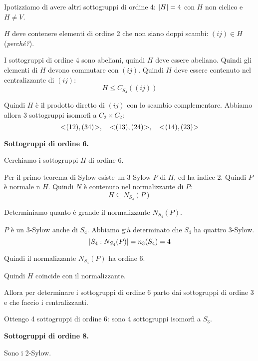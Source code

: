 \begin{soluzione}
    Ipotizziamo di avere altri sottogruppi di ordine 4: $\lvert H \rvert = 4$ con $H$ non ciclico e $H \ne V$.

    $H$ deve contenere elementi di ordine 2 che non siano doppi scambi: $(ij) \in H$ (\emph{perché?}).

    I sottogruppi di ordine 4 sono abeliani, quindi $H$ deve essere abeliano.
    Quindi gli elementi di $H$ devono commutare con $(ij)$.
    Quindi $H$ deve essere contenuto nel centralizzante di $(ij)$:
    \begin{equation*}
        H \le C_{S_4}((ij))
    \end{equation*}

    Quindi $H$ è il prodotto diretto di $(ij)$ con lo scambio complementare.
    Abbiamo allora 3 sottogruppi isomorfi a $C_2 \times C_2$:
    \begin{equation*}
        < \negmedspace (12),(34) \negmedspace >, \quad < \negmedspace (13),(24) \negmedspace >, \quad < \negmedspace (14),(23) \negmedspace >
    \end{equation*}

    \bigskip
    \textbf{Sottogruppi di ordine 6.}

    Cerchiamo i sottogruppi $H$ di ordine 6.

    Per il primo teorema di Sylow esiste un 3-Sylow $P$ di $H$, ed ha indice 2.
    Quindi $P$ è normale n $H$.
    Quindi $N$ è contenuto nel normalizzante di $P$:
    \begin{equation*}
        H \subseteq N_{S_4}(P)
    \end{equation*}

    Determiniamo quanto è grande il normalizzante $N_{S_4}(P)$.

    $P$ è un 3-Sylow anche di $S_4$.
    Abbiamo già determinato che $S_4$ ha quattro 3-Sylow.
    \begin{equation*}
        \lvert S_4:N_{S_4}(P) \rvert = n_3(S_4) = 4
    \end{equation*}

    Quindi il normalizzante $N_{S_4}(P)$ ha ordine 6.

    Quindi $H$ coincide con il normalizzante.

    Allora per determinare i sottogruppi di ordine 6 parto dai sottogruppi di ordine 3 e che faccio i centralizzanti.

    Ottengo 4 sottogruppi di ordine 6: sono 4 sottogruppi isomorfi a $S_3$.

    \bigskip
    \textbf{Sottogruppi di ordine 8.}

    Sono i 2-Sylow.


\end{soluzione}
